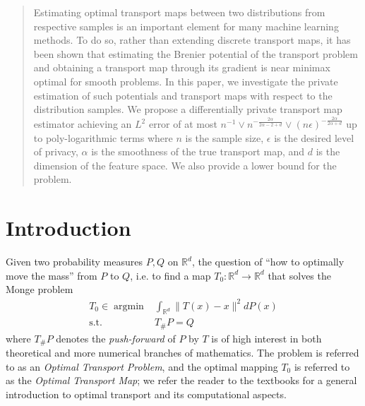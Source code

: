 \documentclass{article}
\theoremstyle{plain}
\theoremstyle{definition}
\theoremstyle{remark}
\newcommand{\R}[0]{\mathbb{R}}
\newcommand{\argmin}[0]{\operatorname{argmin}}
\begin{document}
\begin{abstract}


Estimating optimal transport maps between two distributions from respective samples is an important element for many machine learning methods. 
To do so, rather than extending discrete transport maps, it has been shown that estimating the Brenier potential of the transport problem and obtaining a transport map through its gradient is near minimax optimal for smooth problems. 
In this paper, we investigate the private estimation of such potentials and transport maps with respect to the distribution samples.
We propose a differentially private transport map estimator achieving an $L^2$ error of at most $n^{-1} \vee n^{-\frac{2 \alpha}{2 \alpha - 2 + d}} \vee (n\epsilon)^{-\frac{2 \alpha}{2 \alpha + d}} $ up to poly-logarithmic terms where $n$ is the sample size, $\epsilon$ is the desired level of privacy, $\alpha$ is the smoothness of the true transport map, and $d$ is the dimension of the feature space. 
We also provide a lower bound for the problem.
\end{abstract}

\section{Introduction}
\label{sec:intro}



Given two probability measures $P, Q$ on $\R^d$, the question of ``how to optimally move the mass'' from $P$ to $Q$, i.e. to find a map $T_0: \R^d \rightarrow \R^d$ that solves the Monge \cite{monge1781memoire} problem
\begin{equation}
\label{eq:monge_problem}
    \begin{aligned}
T_0 \in \argmin &\int_{\R^d} \| T(x) - x \|^2 dP(x)\\
\textrm{s.t.} \quad & T_{\#} P = Q
\end{aligned}
\end{equation}
where $ T_{\#} P$ denotes the \emph{push-forward} of $P$ by $T$ is of high interest in both theoretical and more numerical branches of mathematics.
The problem is referred to as an \emph{Optimal Transport Problem}, and the optimal mapping $T_0$ is referred to as the \emph{Optimal Transport Map}; we refer the reader to the textbooks \cite{villani2003topics,villani2009optimal,santambrogio2015optimal,peyre2019computational} for a general introduction to optimal transport and its computational aspects. %
\end{document}

